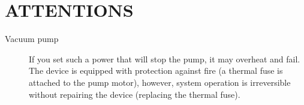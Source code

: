 \documentclass[twoside, 12pt, a4paper]{refart}
\begin{document}
  
  
  
  
  
  
  
  
  
  
  
  
  
  
  
  
  
  \newpage
  \section{ATTENTIONS}
    \begin{description}  
    \item[Vacuum pump]
      If you set such a power that will stop the pump, it may overheat and fail. The device is equipped with protection against fire (a thermal fuse is attached to the pump motor), however, system operation is irreversible without repairing the device (replacing the thermal fuse).
    \end{description} 




\printindex
\end{document}
